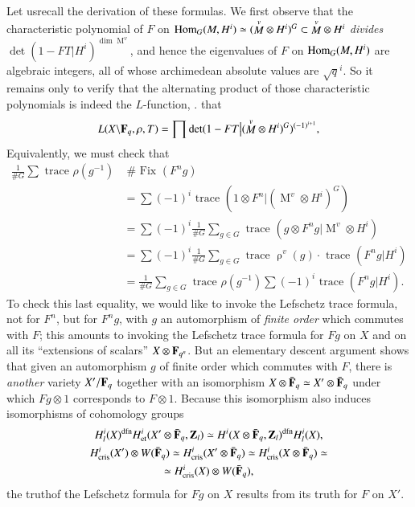 Let us\pageoriginale recall the derivation of these formulas. We first observe that the characteristic polynomial of $F$ on $\operatorname{Hom}_G (M, H^i) \simeq ({\displaystyle{\mathop{M}^v}} \otimes H^i)^G \subset {\displaystyle{\mathop{M}^v}} \otimes H^i$ \textit{divides} $\det (1-F T \big| H^i)^{\dim {\displaystyle{\mathop{M}^v}}}$, and hence the eigenvalues of $F$ on $\operatorname{Hom}_G (M, H^i)$ are algebraic integers, all of whose archimedean absolute values are $\sqrt{q}^i$. So it remains only to verify that the alternating product of those characteristic polynomials is indeed the $L$-function, \ie. that 
$$
L(X \backslash \mathbf{F}_q, \rho, T) = \prod \det (1 - F T \big| ({\displaystyle{\mathop{M}^v}} \otimes H^i)^{G} )^{(-1)^{i+1} },
$$
Equivalently, we must check that 
\begin{align*}
\frac{1}{\# G} \sum \text{ trace }\rho  (g^{-1}) &\;\# \text{ Fix } (F^n g)\\
& = \sum (-1)^i \text{ trace } (1 \otimes F^n \big| ({\displaystyle{\mathop{M}^v}} \otimes H^i)^G)\\
& = \sum (-1)^i \frac{1}{\# G} \sum\limits_{g \in G} \text{ trace } (g \otimes F^n g \big|{\displaystyle{\mathop{M}^v}} \otimes H^i)\\
& = \sum (-1)^{i} \frac{1}{\# G} \sum\limits_{g \in G} \text{ trace } {\displaystyle{\mathop{\rho}^v}} (g) \cdot \text{ trace } (F^n g \big| H^i)\\
& = \frac{1}{\# G} \sum\limits_{g \in G}  \text{ trace } \rho (g^{-1}) \sum (-1)^i \text{ trace } (F^n g \big| H^i). 
\end{align*}
To check this last equality, we would like to invoke the Lefschetz trace formula, not for $F^n$, but for $F^ng$, with $g$ an automorphism of \textit{finite order} which commutes with $F$; this amounts to invoking the Lefschetz trace formula for $Fg$ on $X$ and on all its ``extensions of scalars'' $X \otimes \mathbf{F}_{q^n}$. But an elementary descent argument shows that given an automorphism $g$ of finite order which commutes with $F$, there is \textit{another} variety $X'/ \mathbf{F}_q$ together with an isomorphism $X \otimes \bar{\mathbf{F}}_q \simeq X' \otimes \bar{\mathbf{F}}_q$ under which $F g \otimes 1$ corresponds to $F \otimes 1$. Because this isomorphism also induces isomorphisms of cohomology groups 
\begin{gather*}
H^i_l (X)^{\text{dfn}} H^i_{\text{et}} (X' \otimes \bar{\mathbf{F}}_q, \mathbf{Z}_l) \simeq H^i (X \otimes \bar{\mathbf{F}}_q, \mathbf{Z}_l)^{\text{dfn}} H^i_l(X),\\
H^i_{\text{cris}} (X') \otimes W (\bar{\mathbf{F}}_q) \simeq H^i_{\text{cris}} (X' \otimes \bar{\mathbf{F}}_q) \simeq H^i_{\text{cris}} (X \otimes \bar{\mathbf{F}}_q) \simeq\\
\simeq H^i_{\text{cris}} (X) \otimes W (\bar{\mathbf{F}}_q),
\end{gather*}
the truth\pageoriginale of the Lefschetz formula for $Fg$ on $X$ results from its truth for $F$ on $X'$.

